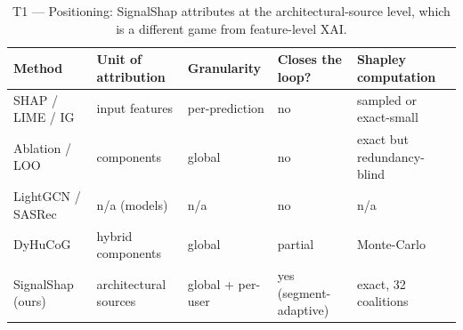 \begin{table}
\caption{T1 — Positioning: SignalShap attributes at the architectural-source level, which is a different game from feature-level XAI.}
\label{tab:T1_positioning}
\begin{tabular}{lllll}
\toprule
Method & Unit of attribution & Granularity & Closes the loop? & Shapley computation \\
\midrule
SHAP / LIME / IG & input features & per-prediction & no & sampled or exact-small \\
Ablation / LOO & components & global & no & exact but redundancy-blind \\
LightGCN / SASRec & n/a (models) & n/a & no & n/a \\
DyHuCoG & hybrid components & global & partial & Monte-Carlo \\
SignalShap (ours) & architectural sources & global + per-user & yes (segment-adaptive) & exact, 32 coalitions \\
\bottomrule
\end{tabular}
\end{table}
